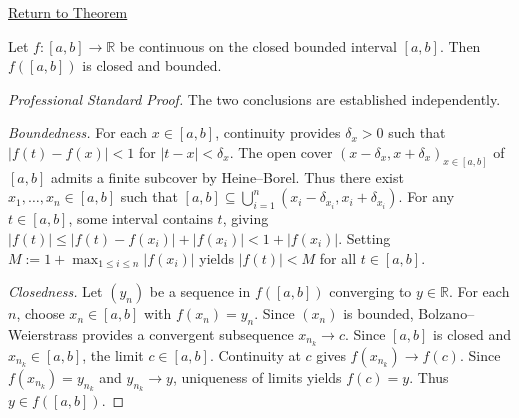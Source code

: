 \newpage
{}
\label{prf:image-closed-bounded-closed-bounded}

\begin{remark*}[Return]
\hyperref[lem:image-closed-bounded-closed-bounded]{Return to Theorem}
\end{remark*}

\begin{theorem*}
Let $f : [a,b] \to \mathbb{R}$ be continuous on the closed bounded interval $[a,b]$. Then $f([a,b])$ is closed and bounded.
\end{theorem*}

\begin{proof}[Professional Standard Proof]
\LRAProofBodyStart
The two conclusions are established independently.

\textit{Boundedness.} For each $x \in [a,b]$, continuity provides $\delta_x > 0$ such that $|f(t) - f(x)| < 1$ for $|t - x| < \delta_x$. The open cover $(x - \delta_x, x + \delta_x)_{x \in [a,b]}$ of $[a,b]$ admits a finite subcover by Heine--Borel. Thus there exist $x_1, \ldots, x_n \in [a,b]$ such that $[a,b] \subseteq \bigcup_{i=1}^{n} (x_i - \delta_{x_i}, x_i + \delta_{x_i})$. For any $t \in [a,b]$, some interval contains $t$, giving $|f(t)| \leq |f(t) - f(x_i)| + |f(x_i)| < 1 + |f(x_i)|$. Setting $M := 1 + \max_{1 \leq i \leq n} |f(x_i)|$ yields $|f(t)| < M$ for all $t \in [a,b]$.

\textit{Closedness.} Let $(y_n)$ be a sequence in $f([a,b])$ converging to $y \in \mathbb{R}$. For each $n$, choose $x_n \in [a,b]$ with $f(x_n) = y_n$. Since $(x_n)$ is bounded, Bolzano--Weierstrass provides a convergent subsequence $x_{n_k} \to c$. Since $[a,b]$ is closed and $x_{n_k} \in [a,b]$, the limit $c \in [a,b]$. Continuity at $c$ gives $f(x_{n_k}) \to f(c)$. Since $f(x_{n_k}) = y_{n_k}$ and $y_{n_k} \to y$, uniqueness of limits yields $f(c) = y$. Thus $y \in f([a,b])$.
\end{proof}

